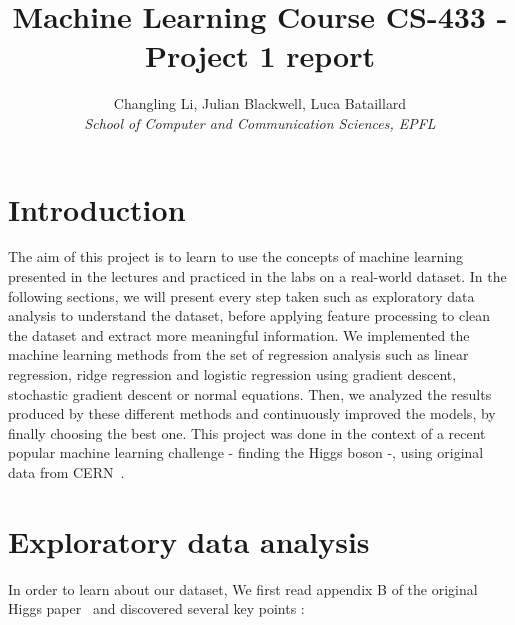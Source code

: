 \documentclass[10pt,conference,compsocconf]{IEEEtran}
\begin{document}
\title{Machine Learning Course CS-433 - Project 1 report}

\author{
  Changling Li, Julian Blackwell, Luca Bataillard\\
  \textit{School of Computer and Communication Sciences, EPFL}
}

\maketitle

\section{Introduction}
The aim of this project is to learn to use the concepts of machine learning presented in the lectures and practiced in the labs on a
real-world dataset. In the following sections, we will present every step taken such as exploratory data analysis to understand the dataset, before applying feature processing to clean the dataset and extract more meaningful information. We implemented the machine learning methods from the set of regression analysis such as linear regression, ridge regression and logistic regression using gradient descent, stochastic gradient descent or normal equations. Then, we analyzed the results produced by these different methods and continuously improved the models, by finally choosing the best one. This project was done in the context of a recent popular machine learning challenge - finding the Higgs boson -, using original data from CERN~\cite{higgs}.

\section{Exploratory data analysis}
\label{sec:structure-paper}

In order to learn about our dataset, We first read appendix B of the original Higgs paper~\cite{higgs} and discovered several key points : 
\end{document}
